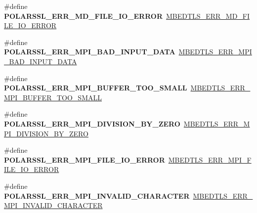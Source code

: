 \begin{DoxyCompactItemize}
\#define {\bfseries P\+O\+L\+A\+R\+S\+S\+L\+\_\+\+E\+R\+R\+\_\+\+M\+D\+\_\+\+F\+I\+L\+E\+\_\+\+I\+O\+\_\+\+E\+R\+R\+OR}~\mbox{\hyperlink{md_8h_aab0a160e4b0efdd4cc8cbe12b4813047}{M\+B\+E\+D\+T\+L\+S\+\_\+\+E\+R\+R\+\_\+\+M\+D\+\_\+\+F\+I\+L\+E\+\_\+\+I\+O\+\_\+\+E\+R\+R\+OR}}
\item 
\mbox{\label{compat-1_83_8h_aad5959617396031440786cd8ff24712a}} 
\#define {\bfseries P\+O\+L\+A\+R\+S\+S\+L\+\_\+\+E\+R\+R\+\_\+\+M\+P\+I\+\_\+\+B\+A\+D\+\_\+\+I\+N\+P\+U\+T\+\_\+\+D\+A\+TA}~\mbox{\hyperlink{bignum_8h_a3989a97b1d92d04dd05242731e6f37f2}{M\+B\+E\+D\+T\+L\+S\+\_\+\+E\+R\+R\+\_\+\+M\+P\+I\+\_\+\+B\+A\+D\+\_\+\+I\+N\+P\+U\+T\+\_\+\+D\+A\+TA}}
\item 
\mbox{\label{compat-1_83_8h_ab0139fd8e0536a4bd1da18c9ea5bcb84}} 
\#define {\bfseries P\+O\+L\+A\+R\+S\+S\+L\+\_\+\+E\+R\+R\+\_\+\+M\+P\+I\+\_\+\+B\+U\+F\+F\+E\+R\+\_\+\+T\+O\+O\+\_\+\+S\+M\+A\+LL}~\mbox{\hyperlink{bignum_8h_a7fc9b9c20686c88b949d0a35c0def909}{M\+B\+E\+D\+T\+L\+S\+\_\+\+E\+R\+R\+\_\+\+M\+P\+I\+\_\+\+B\+U\+F\+F\+E\+R\+\_\+\+T\+O\+O\+\_\+\+S\+M\+A\+LL}}
\item 
\mbox{\label{compat-1_83_8h_a96380f09df1ad46baba97af000b05466}} 
\#define {\bfseries P\+O\+L\+A\+R\+S\+S\+L\+\_\+\+E\+R\+R\+\_\+\+M\+P\+I\+\_\+\+D\+I\+V\+I\+S\+I\+O\+N\+\_\+\+B\+Y\+\_\+\+Z\+E\+RO}~\mbox{\hyperlink{bignum_8h_a97e2c5a552770757da26b4a9b2e56f6c}{M\+B\+E\+D\+T\+L\+S\+\_\+\+E\+R\+R\+\_\+\+M\+P\+I\+\_\+\+D\+I\+V\+I\+S\+I\+O\+N\+\_\+\+B\+Y\+\_\+\+Z\+E\+RO}}
\item 
\mbox{\label{compat-1_83_8h_a4f10c6e250b7a06f2fc01ce48a823fc8}} 
\#define {\bfseries P\+O\+L\+A\+R\+S\+S\+L\+\_\+\+E\+R\+R\+\_\+\+M\+P\+I\+\_\+\+F\+I\+L\+E\+\_\+\+I\+O\+\_\+\+E\+R\+R\+OR}~\mbox{\hyperlink{bignum_8h_a5ba505f058780047978dcdafd50d0b1e}{M\+B\+E\+D\+T\+L\+S\+\_\+\+E\+R\+R\+\_\+\+M\+P\+I\+\_\+\+F\+I\+L\+E\+\_\+\+I\+O\+\_\+\+E\+R\+R\+OR}}
\item 
\mbox{\label{compat-1_83_8h_af2d758961ae9e4085d2a43588ecb782a}} 
\#define {\bfseries P\+O\+L\+A\+R\+S\+S\+L\+\_\+\+E\+R\+R\+\_\+\+M\+P\+I\+\_\+\+I\+N\+V\+A\+L\+I\+D\+\_\+\+C\+H\+A\+R\+A\+C\+T\+ER}~\mbox{\hyperlink{bignum_8h_a0ef495d9a083d986f00e5f604126382f}{M\+B\+E\+D\+T\+L\+S\+\_\+\+E\+R\+R\+\_\+\+M\+P\+I\+\_\+\+I\+N\+V\+A\+L\+I\+D\+\_\+\+C\+H\+A\+R\+A\+C\+T\+ER}}

\end{DoxyCompactItemize}
